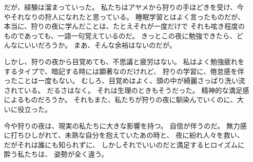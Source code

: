 \documentclass[../IHMain]{subfiles}
\begin{document}
だが、経験は溜まっていった。
私たちはアヤメから狩りの手ほどきを受け、今やそれなりの狩人になれたと思っている。
睡眠学習とはよく言ったものだが、本当に、狩りの夜に学んだことは、たとえそれが一度だけで
それも呟き程度のものであっても、一語一句覚えているのだ。
きっとこの夜に勉強できたら、どんなにいいだろうか。
まあ、そんな余裕はないのだが。

しかし、狩りの夜から目覚めても、不思議と疲労はない。
私はよく勉強疲れをするタイプで、暗記する時には顕著なのだけれど、
狩りの学習に、倦怠感を伴ったことは一度もない。
むしろ、目覚めはよく、頭の中が綺麗さっぱり洗い流されている。
だるさはなく。
それは生理のときもそうだった。
精神的な満足感によるものだろうか。
それもまた、私たちが狩りの夜に馴染んでいくのに、大いに役立った。

今や狩りの夜は、現実の私たちに大きな影響を持つ。
自信が伴うのだ。
無力感に打ちひしがれて、未熟な自分を抱えていたあの時と、
夜に紛れ人々を救い、だがそれは誰にも知られずに、
しかしそれでいいのだと満足するヒロイズムに酔う私たちは、
姿勢が全く違う。
\end{document}
